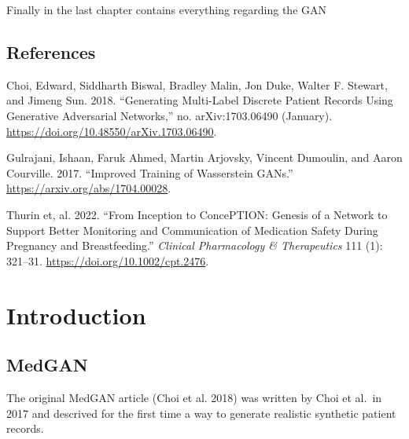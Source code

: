 \documentclass[
  letterpaper,
  DIV=11,
  numbers=noendperiod]{scrreprt}
\newlength{\cslhangindent}
\newlength{\cslentryspacingunit} %
\newenvironment{CSLReferences}[2] %
 {%
  \setlength{\parindent}{0pt}
  \ifodd #1
  \let\oldpar\par
  \def\par{\hangindent=\cslhangindent\oldpar}
  \fi
  \setlength{\parskip}{#2\cslentryspacingunit}
 }%
 {}
\begin{document}
Finally in the last chapter contains everything regarding the GAN


\hypertarget{references}{%
\chapter*{References}\label{references}}


\hypertarget{refs}{}
\begin{CSLReferences}{1}{0}
\leavevmode{}%
Choi, Edward, Siddharth Biswal, Bradley Malin, Jon Duke, Walter F.
Stewart, and Jimeng Sun. 2018. {``Generating Multi-Label Discrete
Patient Records Using Generative Adversarial Networks,''} no.
arXiv:1703.06490 (January).
\url{https://doi.org/10.48550/arXiv.1703.06490}.

\leavevmode{}%
Gulrajani, Ishaan, Faruk Ahmed, Martin Arjovsky, Vincent Dumoulin, and
Aaron Courville. 2017. {``Improved Training of Wasserstein GANs.''}
\url{https://arxiv.org/abs/1704.00028}.

\leavevmode{}%
Thurin et, al. 2022. {``From Inception to ConcePTION: Genesis of a
Network to Support Better Monitoring and Communication of Medication
Safety During Pregnancy and Breastfeeding.''} \emph{Clinical
Pharmacology \& Therapeutics} 111 (1): 321--31.
\url{https://doi.org/10.1002/cpt.2476}.

\end{CSLReferences}

\part{Introduction}

\hypertarget{medgan}{%
\chapter{MedGAN}\label{medgan}}

The original MedGAN article (Choi et al. 2018) was written by Choi et
al.~in 2017 and descrived for the first time a way to generate realistic
synthetic patient records.
\end{document}
